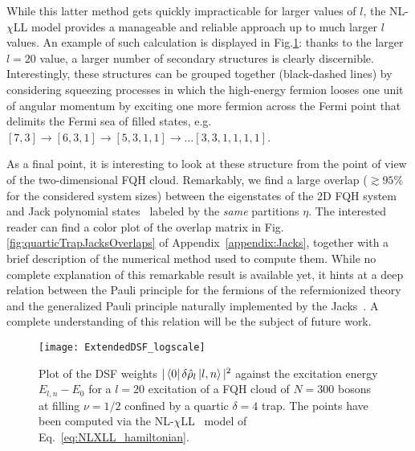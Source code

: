 \documentclass[twocolumn,pra,superscriptaddress,noshowpacs]{revtex4}
\newcommand{\nlchill}{NL-$\chi$LL }
\begin{document}
While this latter method gets quickly impracticable for larger values of $l$, the \nlchill model provides a manageable and reliable approach up to much larger $l$ values. An example of such calculation is displayed in Fig.\ref{fig:ExtendedDSFLogScale}: thanks to the larger $l=20$ value, a larger number of secondary structures is clearly discernible.
Interestingly, these structures can be grouped together (black-dashed lines) by considering squeezing processes in which the high-energy fermion looses one unit of angular momentum by exciting one more fermion across the Fermi point that delimits the Fermi sea of filled states, e.g.  $[7,3]\rightarrow[6,3,1]\rightarrow[5,3,1,1]\rightarrow\hdots[3,3,1,1,1,1]$.

As a final point, it is interesting to look at these structure from the point of view of the two-dimensional FQH cloud. Remarkably, we find a large overlap ($\gtrsim 95\%$ for the considered system sizes) 
between the eigenstates of the 2D FQH system and
Jack polynomial states~\cite{Macaluso_PRA_2017,Macaluso_PRA_2018} labeled by the \textit{same} partitions $\eta$. %
The interested reader can find a color plot of the overlap matrix in Fig.\ref{fig:quarticTrapJacksOverlaps} of Appendix~\ref{appendix:Jacks}, together with a brief description of the numerical method used to compute them. 
While no complete explanation of this remarkable result is available yet, it hints at a deep relation between the Pauli principle for the fermions of the refermionized theory and the generalized Pauli principle naturally implemented by the Jacks~\cite{BernevigHaldane_PRL_2008}. 
A complete understanding of this relation will be the subject of future work.

\begin{figure}[htbp]
   	\begin{adjustbox}{width=.5\textwidth, totalheight=\baselineskip,keepaspectratio,right}
      	\texttt{[image: ExtendedDSF\_logscale]}
    \end{adjustbox}
    \vspace{0.0cm}\caption{
    Plot of the DSF weights $|\bra{0}\delta\hat\rho_l\ket{l,n}|^2$ against the excitation energy $E_{l,n}-E_0$ for a $l=20$ excitation of a FQH cloud of $N=300$ bosons at filling $\nu=1/2$ confined by a quartic $\delta=4$ trap. The points have been computed via the \nlchill~model of Eq.~\eqref{eq:NLXLL_hamiltonian}.
    \label{fig:ExtendedDSFLogScale}}
\end{figure}
 
\end{document}
